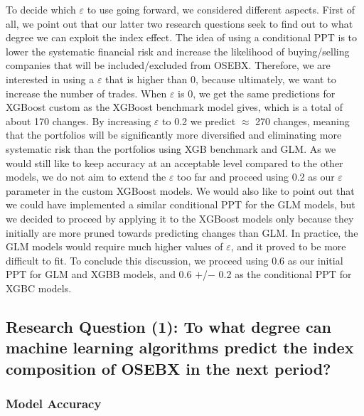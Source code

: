 To decide which $\varepsilon$ to use going forward, we considered different aspects. First of all, we point out that our latter two research questions seek to find out to what degree we can exploit the index effect. The idea of using a conditional PPT is to lower the systematic financial risk and increase the likelihood of buying/selling companies that will be included/excluded from OSEBX. Therefore, we are interested in using a $\varepsilon$ that is higher than 0, because ultimately, we want to increase the number of trades. When $\varepsilon$ is 0, we get the same predictions for XGBoost custom as the XGBoost benchmark model gives, which is a total of about 170 changes. By increasing $\varepsilon$ to 0.2 we predict $\approx$ 270 changes, meaning that the portfolios will be significantly more diversified and eliminating more systematic risk than the portfolios using XGB benchmark and GLM. As we would still like to keep accuracy at an acceptable level compared to the other models, we do not aim to extend the $\varepsilon$ too far and proceed using 0.2 as our $\varepsilon$ parameter in the custom XGBoost models. We would also like to point out that we could have implemented a similar conditional PPT for the GLM models, but we decided to proceed by applying it to the XGBoost models only because they initially are more pruned towards predicting changes than GLM. In practice, the GLM models would require much higher values of $\varepsilon$, and it proved to be more difficult to fit. To conclude this discussion, we proceed using 0.6 as our initial PPT for GLM and XGBB models, and 0.6 $+$/$-$ 0.2 as the conditional PPT for XGBC models.


\subsection{Research Question (1): To what degree can machine learning algorithms predict the index composition of OSEBX in the next period?}

\subsubsection{Model Accuracy}

